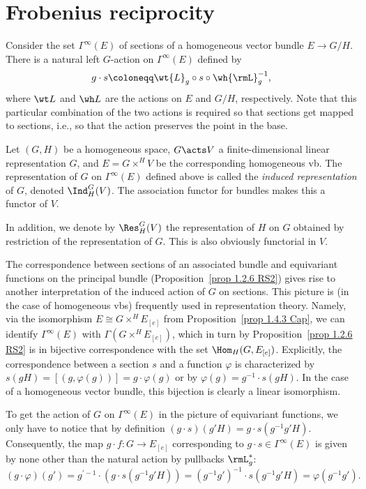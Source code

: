 \section{Frobenius reciprocity}\label{sec: Frobenius reciprocity}

Consider the set $\Gamma^\infty(E)$ of sections of a homogeneous vector bundle $E\to G\slash H$. There is a natural left $G$-action on $\Gamma^\infty(E)$ defined by
\[g\cdot s\coloneqq \wt{L}_g\circ s\circ\wh{\rmL}^{-1}_g,\]
where $\wt L$ and $\wh L$ are the actions on $E$ and $G\slash H$, respectively. Note that this particular combination of the two actions is required so that sections get mapped to sections, i.e., so that the action preserves the point in the base.

\begin{defn}
    Let $(G,H)$ be a homogeneous space, $G\acts V$ a finite-dimensional linear representation $G$, and $E=G\times^H V$ be the corresponding homogeneous \gls{vb}. The representation of $G$ on $\Gamma^\infty(E)$ defined above is called the \emph{induced representation} of $G$, denoted $\Ind^G_H(V)$. The association functor for bundles makes this a functor of $V$.

    In addition, we denote by $\Res^G_H(V)$ the representation of $H$ on $G$ obtained by restriction of the representation of $G$. This is also obviously functorial in $V$.
\end{defn}

The correspondence between sections of an associated bundle and equivariant functions on the principal bundle (Proposition~\ref{prop 1.2.6 RS2}) gives rise to another interpretation of the induced action of $G$ on sections. This picture is (in the case of homogeneous \glspl{vb}) frequently used in representation theory. Namely, via the isomorphism $E\cong G\times^H E_{[e]}$ from Proposition~\ref{prop 1.4.3 Cap}, we can identify $\Gamma^\infty(E)$ with $\Gamma\left(G\times^H E_{[e]}\right)$, which in turn by Proposition~\ref{prop 1.2.6 RS2} is in bijective correspondence with the set $\Hom_H(G,E_{[e]})$. Explicitly, the correspondence between a section $s$ and a function $\varphi$ is characterized by $s(gH)=[(g,\varphi(g))]=g\cdot \varphi(g)$ or by $\varphi(g)=g^{-1}\cdot s(gH)$. In the case of a homogeneous vector bundle, this bijection is clearly a linear isomorphism.

To get the action of $G$ on $\Gamma^\infty(E)$ in the picture of equivariant functions, we only have to notice that by definition $(g\cdot  s)(g'H)=g\cdot  s(g^{-1}g'H)$. Consequently, the map $g\cdot f:G\to E_{[e]}$ corresponding to $g\cdot s\in \Gamma^\infty(E)$ is given by none other than the natural action by pullbacks $\rmL_g^\ast$:
\[(g\cdot \varphi)(g')=g^{\prime-1}\cdot(g\cdot s(g^{-1}g'H))=(g^{-1}g')^{-1}\cdot s(g^{-1}g'H)=\varphi(g^{-1}g').\]

